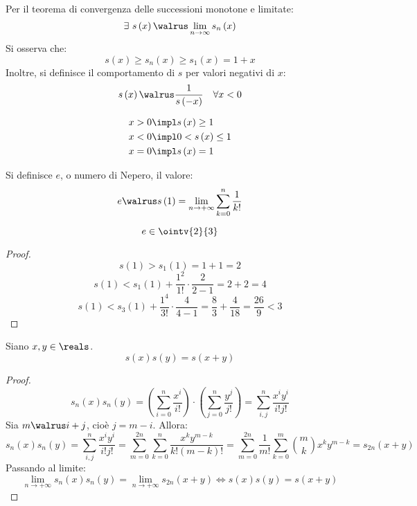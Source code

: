Per il teorema di convergenza delle successioni monotone e limitate:
$$\exists\ s\left( x \right)\walrus \lim_{n\to\infty}s_n\left( x \right)$$
Si osserva che:
$$s\left( x \right)\ge s_n\left( x \right)\ge s_1\left( x \right)=1+x$$
Inoltre, si definisce il comportamento di $s$ per valori negativi di $x$:
$$s\left( x \right)\walrus\frac{1}{s\left( -x \right)}\quad \forall x<0$$
\begin{observation}
  \begin{align*}
    x>0 & \impl s\left( x \right)\ge1   \\
    x<0 & \impl 0<s\left( x \right)\le1 \\
    x=0 & \impl s\left( x \right)=1     
  \end{align*}
\end{observation}

\begin{definition}[$e$]
  Si definisce $e$, o numero di Nepero, il valore:
  $$e\walrus s\left( 1 \right)=\lim_{n\to+\infty}\sum_{k=0}^n\frac{1}{k!}$$
\end{definition}

\begin{observation}
  $$e\in\ointv{2}{3}$$
\end{observation}
\begin{proof}
  $$s\left( 1 \right)> s_1\left( 1 \right)=1+1=2$$
  $$s\left( 1 \right)< s_1\left( 1 \right)+\frac{1^2}{1!}\cdot\frac{2}{2-1}=2+2=4$$
  $$s\left( 1 \right)< s_3\left( 1 \right)+\frac{1^4}{3!}\cdot\frac{4}{4-1}=\frac{8}{3}+\frac{4}{18}=\frac{26}{9}<3$$
\end{proof}

\begin{theorem}
  Siano $x,y\in\reals$.
  $$s\left( x \right)s\left( y \right)=s\left( x+y \right)$$
\end{theorem}
\begin{proof}
  $$s_n\left( x \right)s_n\left( y \right)=\left( \sum_{i=0}^n\frac{x^i}{i!} \right)\cdot\left( \sum_{j=0}^n\frac{y^j}{j!} \right)=\sum_{i,j}^n\frac{x^iy^i}{i!j!}$$
  Sia $m\walrus i+j$, cioè $j=m-i$. Allora:
  $$s_n\left( x \right)s_n\left( y \right)=\sum_{i,j}^n\frac{x^iy^i}{i!j!}=\sum_{m=0}^{2n}\sum_{k=0}^n\frac{x^ky^{m-k}}{k!\left( m-k \right)!}=\sum_{m=0}^{2n}\frac{1}{m!}\sum_{k=0}^m\binom{m}{k}x^ky^{m-k}=s_{2n}\left( x+y \right)$$
  Passando al limite:
  $$\lim_{n\to+\infty}s_n\left( x \right)s_n\left( y \right)=\lim_{n\to+\infty}s_{2n}\left( x+y \right)\iff s\left( x \right)s\left( y \right)=s\left( x+y \right)$$
\end{proof}

